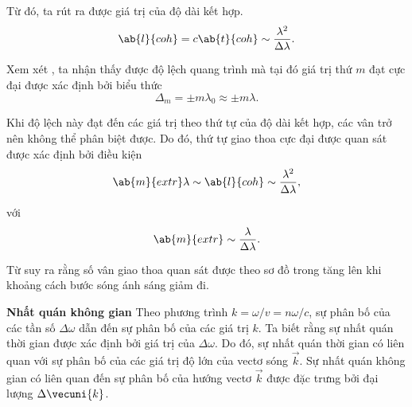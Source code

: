 \noindent
Từ đó, ta rút ra được giá trị của độ dài kết hợp.
\begin{equation}\label{eq:17_21}
    \ab{l}{coh} = c \ab{t}{coh} \sim \frac{\lambda^2}{\Delta{\lambda}}.
\end{equation}

Xem xét , ta nhận thấy được độ lệch quang trình mà tại đó giá trị thứ $m$ đạt cực đại được xác định bởi biểu thức
\begin{equation*}
    \Delta_m = \pm m \lambda_0 \approx \pm m \lambda.
\end{equation*}

\noindent
Khi độ lệch này đạt đến các giá trị theo thứ tự của độ dài kết hợp, các vân trở nên không thể phân biệt được.
Do đó, thứ tự giao thoa cực đại được quan sát được xác định bởi điều kiện
\begin{equation*}
    \ab{m}{extr} \lambda \sim \ab{l}{coh} \sim \frac{\lambda^2}{\Delta{\lambda}},
\end{equation*}

\noindent
với
\begin{equation}\label{eq:17_22}
    \ab{m}{extr} \sim \frac{\lambda}{\Delta{\lambda}}.
\end{equation}

\noindent
Từ  suy ra rằng số vân giao thoa quan sát được theo sơ đồ trong  tăng lên khi khoảng cách bước sóng ánh sáng giảm đi.

\textbf{Nhất quán không gian}
Theo phương trình $k=\omega/v = n\omega/c$, sự phân bố của các tần số $\Delta{\omega}$ dẫn đến sự phân bố của các giá trị $k$.
Ta biết rằng sự nhất quán thời gian được xác định bởi giá trị của $\Delta{\omega}$.
Do đó, sự nhất quán thời gian có liên quan với sự phân bố của các giá trị độ lớn của vectơ sóng $\vec{k}$.
Sự nhất quán không gian có liên quan đến sự phân bố của hướng vectơ $\vec{k}$ được đặc trưng bởi đại lượng $\Delta{\vecuni{k}}$.


